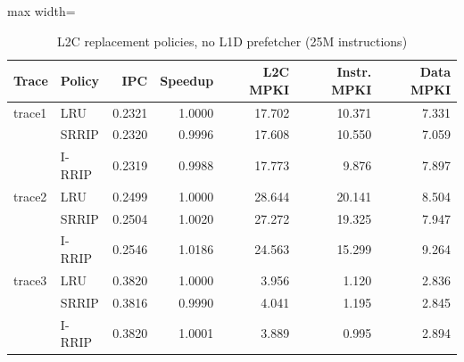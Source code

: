 \begin{table}[t]
\centering
\caption{L2C replacement policies, no L1D prefetcher (25M instructions)}
\label{tab:task2a}
\footnotesize
\setlength{\tabcolsep}{3pt}
\begin{adjustbox}{max width=\linewidth}
\begin{tabular}{llrrrrr}
\toprule
Trace & Policy & IPC & Speedup & L2C MPKI & Instr. MPKI & Data MPKI \\
\midrule
trace1 & LRU & 0.2321 & 1.0000 & 17.702 & 10.371 & 7.331 \\
 & SRRIP & 0.2320 & 0.9996 & 17.608 & 10.550 & 7.059 \\
 & I-RRIP & 0.2319 & 0.9988 & 17.773 & 9.876 & 7.897 \\
\midrule
trace2 & LRU & 0.2499 & 1.0000 & 28.644 & 20.141 & 8.504 \\
 & SRRIP & 0.2504 & 1.0020 & 27.272 & 19.325 & 7.947 \\
 & I-RRIP & 0.2546 & 1.0186 & 24.563 & 15.299 & 9.264 \\
\midrule
trace3 & LRU & 0.3820 & 1.0000 & 3.956 & 1.120 & 2.836 \\
 & SRRIP & 0.3816 & 0.9990 & 4.041 & 1.195 & 2.845 \\
 & I-RRIP & 0.3820 & 1.0001 & 3.889 & 0.995 & 2.894 \\
\bottomrule
\end{tabular}
\end{adjustbox}
\end{table}
